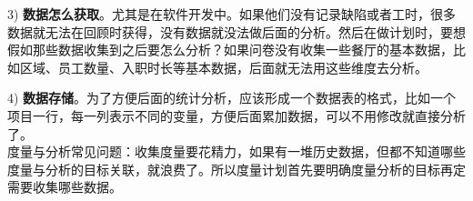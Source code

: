 3)
\textbf{数据怎么获取}。尤其是在软件开发中。如果他们没有记录缺陷或者工时，很多数据就无法在回顾时获得，没有数据就没法做后面的分析。然后在做计划时，要想假如那些数据收集到之后要怎么分析？如果问卷没有收集一些餐厅的基本数据，比如区域、员工数量、入职时长等基本数据，后面就无法用这些维度去分析。

4)
\textbf{数据存储}。为了方便后面的统计分析，应该形成一个数据表的格式，比如一个项目一行，每一列表示不同的变量，方便后面累加数据，可以不用修改就直接分析了。\\

度量与分析常见问题：收集度量要花精力，如果有一堆历史数据，但都不知道哪些度量与分析的目标关联，就浪费了。所以度量计划首先要明确度量分析的目标再定需要收集哪些数据。


